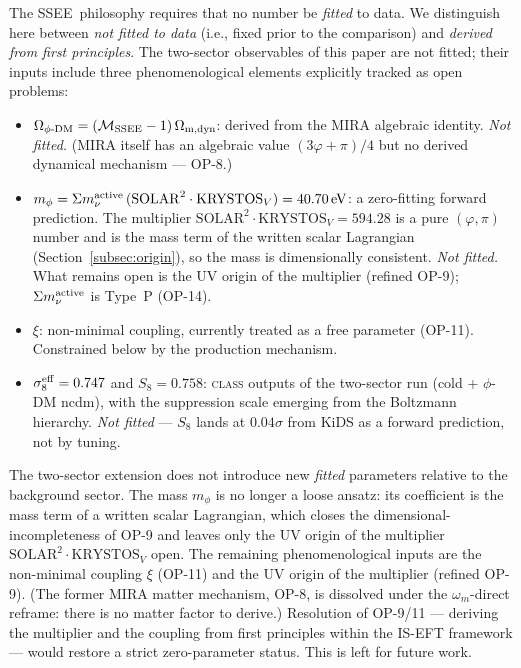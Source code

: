\documentclass[12pt,a4paper]{article}
\newcommand{\SSEE}{\textsc{SSEE}}
\newcommand{\phiDM}{\phi\text{-DM}}
\newcommand{\MIRA}{\mathcal{M}_{\rm SSEE}}
\newcommand{\mphi}{m_\phi}
\newcommand{\mnu}{\Sigma m_\nu}
\newcommand{\sigeff}{\sigma_8^{\rm eff}}
\begin{document}
The \SSEE\ philosophy requires that no number be \emph{fitted} to data. We
distinguish here between \emph{not fitted to data} (i.e., fixed prior to the
comparison) and \emph{derived from first principles}. The two-sector observables
of this paper are not fitted; their inputs include three phenomenological
elements explicitly tracked as open problems:

\begin{itemize}
  \item $\Omega_{\phiDM} = (\MIRA - 1)\,\Omega_{\rm m,dyn}$: derived from the
    MIRA algebraic identity. \emph{Not fitted.} (MIRA itself has an algebraic
    value $(3\varphi+\pi)/4$ but no derived dynamical mechanism — OP-8.)
  \item $\mphi = \mnu^{\rm active}\,(\mathrm{SOLAR}^2\cdot\mathrm{KRYSTOS}_V)
    = 40.70\,\mathrm{eV}$: a zero-fitting forward prediction. The multiplier
    $\mathrm{SOLAR}^2\cdot\mathrm{KRYSTOS}_V = 594.28$ is a pure $(\varphi,\pi)$
    number and is the mass term of the written scalar Lagrangian
    (Section~\ref{subsec:origin}), so the mass is dimensionally consistent.
    \emph{Not fitted.} What remains open is the UV origin of the multiplier
    (refined OP-9); $\Sigma m_\nu^{\rm active}$ is Type~P (OP-14).
  \item $\xi$: non-minimal coupling, currently treated as a free parameter
    (OP-11). Constrained below by the production mechanism.
  \item $\sigeff = 0.747$ and $S_8 = 0.758$: \textsc{class} outputs of the
    two-sector run (cold + $\phi$-DM ncdm), with the suppression scale emerging
    from the Boltzmann hierarchy. \emph{Not fitted} — $S_8$ lands at $0.04\sigma$
    from KiDS as a forward prediction, not by tuning.
\end{itemize}

The two-sector extension does not introduce new \emph{fitted} parameters
relative to the background sector. The mass $m_\phi$ is no longer a loose
ansatz: its coefficient is the mass term of a written scalar Lagrangian, which
closes the dimensional-incompleteness of OP-9 and leaves only the UV origin of
the multiplier $\mathrm{SOLAR}^2\cdot\mathrm{KRYSTOS}_V$ open. The remaining
phenomenological inputs are the non-minimal coupling $\xi$ (OP-11) and the UV
origin of the multiplier (refined OP-9). (The former MIRA matter mechanism,
OP-8, is dissolved under the $\omega_m$-direct reframe: there is no matter
factor to derive.) Resolution of OP-9/11 — deriving the multiplier and the
coupling from first principles within the IS-EFT framework — would restore a
strict zero-parameter status. This is left for future work.
\end{document}
